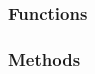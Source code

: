 \documentclass[notes]{beamer}
\begin{document}
\begin{frame}[fragile]
	\frametitle{}
	
\end{frame}

\begin{frame}[fragile]
	\frametitle{Functions}
\end{frame}

\begin{frame}[fragile]
	\frametitle{Methods}
\end{frame}
\end{document}
